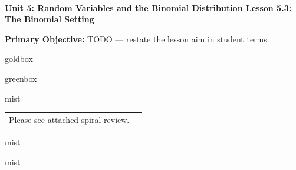 \documentclass[10pt]{article}
\newcommand{\UnitNumberName}{Unit 5: Random Variables and the Binomial Distribution \quad}
\newcommand{\LessonNumberName}{Lesson 5.3: The Binomial Setting}
\begin{document}
\begin{center}
    {\Large\bfseries \CourseName \\
    {\small\bfseries \UnitNumberName \LessonNumberName}}
\end{center}

\begin{tcolorbox}[colback=mist, colframe=royal, boxrule=0.9pt, arc=2mm,
    left=2mm, right=2mm, top=1.5mm, bottom=1.5mm]
    \textbf{Primary Objective:} TODO --- restate the lesson aim in student terms
\end{tcolorbox}

\renewcommand{\arraystretch}{1.6}
\begin{skillbox}{goldbox}
\end{skillbox}

\begin{skillbox}{greenbox}
\end{skillbox}

\begin{fixedskillbox}{mist}
    \begin{tabularx}{\linewidth}{@{}X c@{}}
        \begin{minipage}[t]{0.55\linewidth}\vspace{0pt}
            Please see attached spiral review.  %
        \end{minipage}
        &
        \begin{minipage}[t]{0.38\linewidth}\vspace{0pt}\centering
        \end{minipage}
    \end{tabularx}
\end{fixedskillbox}

\begin{skillbox}[Hook]{mist}
\end{skillbox}

\begin{skillbox}[Lesson]{mist}
\end{skillbox}
\end{document}
